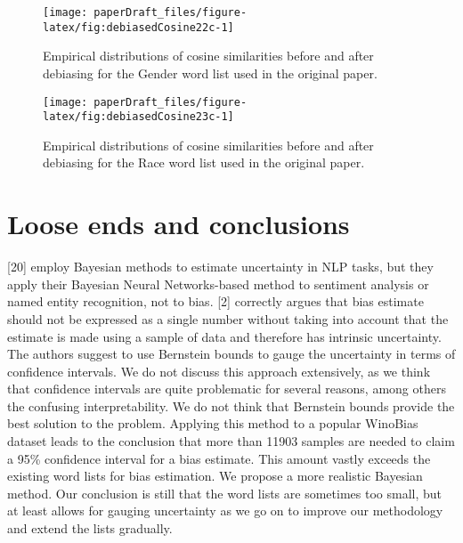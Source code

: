 \documentclass[
  12pt,
  dvipsnames,enabledeprecatedfontcommands]{scrartcl}
\begin{document}
\begin{figure}[H]

\begin{center}\texttt{[image: paperDraft\_files/figure-latex/fig:debiasedCosine22c-1]} \end{center}
\caption{Empirical distributions of cosine similarities before and after  debiasing for  the Gender word list used in  the original paper.}
\label{fig:empiricalDebiased2}
\end{figure}

\begin{figure}[H]

\begin{center}\texttt{[image: paperDraft\_files/figure-latex/fig:debiasedCosine23c-1]} \end{center}
\caption{Empirical distributions of cosine similarities before and after  debiasing for the Race word list used in  the original paper.}
\label{fig:empiricalDebiased3}
\end{figure}

\hypertarget{loose-ends-and-conclusions}{%
\section{Loose ends and conclusions}\label{loose-ends-and-conclusions}}

\label{sec:related}

{[}20{]} employ Bayesian methods to estimate uncertainty in NLP tasks,
but they apply their Bayesian Neural Networks-based method to sentiment
analysis or named entity recognition, not to bias. {[}2{]} correctly
argues that bias estimate should not be expressed as a single number
without taking into account that the estimate is made using a sample of
data and therefore has intrinsic uncertainty. The authors suggest to use
Bernstein bounds to gauge the uncertainty in terms of confidence
intervals. We do not discuss this approach extensively, as we think that
confidence intervals are quite problematic for several reasons, among
others the confusing interpretability. We do not think that Bernstein
bounds provide the best solution to the problem. Applying this method to
a popular WinoBias dataset leads to the conclusion that more than 11903
samples are needed to claim a 95\% confidence interval for a bias
estimate. This amount vastly exceeds the existing word lists for bias
estimation. We propose a more realistic Bayesian method. Our conclusion
is still that the word lists are sometimes too small, but at least
allows for gauging uncertainty as we go on to improve our methodology
and extend the lists gradually.
\end{document}
